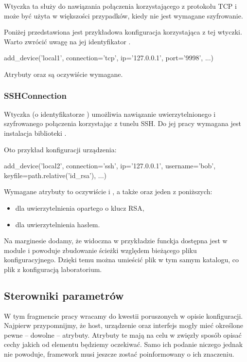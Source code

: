 \documentclass[00-praca-magisterska.tex]{subfiles}
\begin{document}
Wtyczka ta służy do nawiązania połączenia korzystającego z protokołu TCP i może
być użyta w większości przypadków, kiedy nie jest wymagane szyfrowanie.

Poniżej przedstawiona jest przykładowa konfiguracja korzystająca z tej wtyczki.
Warto zwrócić uwagę na jej identyfikator .

\begin{pythoncode}
  add_device('local1',
    connection='tcp',
    ip='127.0.0.1',
    port='9998',
    ...)
\end{pythoncode}

Atrybuty  oraz  są oczywiście wymagane.

\subsubsection{SSHConnection}

Wtyczka  (o identyfikatorze ) umożliwia
nawiązanie uwierzytelnionego i szyfrowanego połączenia korzystając z tunelu
SSH. Do jej pracy wymagana jest instalacja biblioteki .

Oto przykład konfiguracji urządzenia:

\begin{pythoncode}
  add_device('local2',
    connection='ssh',
    ip='127.0.0.1',
    username='bob',
    keyfile=path.relative('id_rsa'),
    ...)
\end{pythoncode}

Wymagane atrybuty to oczywiście  i , a także
 oraz jeden z poniższych:
\begin{itemize}
\item {} dla uwierzytelnienia opartego o klucz RSA,
\item {} dla uwierzytelnienia hasłem.
\end{itemize}

Na marginesie dodamy, że widoczna w przykładzie funckja 
dostępna jest w module  i powoduje zbudowanie ścieżki względem
bieżącego pliku konfiguracyjnego. Dzięki temu można umieścić plik
 w tym samym katalogu, co plik z konfiguracją laboratorium.

\subsection{Sterowniki parametrów}

W tym fragmencie pracy wracamy do kwestii poruszonych w opisie konfiguracji.
Najpierw przypomnijmy, że host, urządzenie oraz interfejs mogły mieć określone
pewne -- dowolne -- atrybuty. Atrybuty te mają na celu w zwięzły sposób opisać
cechy jakich od elementu będziemy oczekiwać. Samo ich podanie niczego jednak nie
powoduje, framework musi jeszcze zostać poinformowany o ich znaczeniu.
\end{document}

